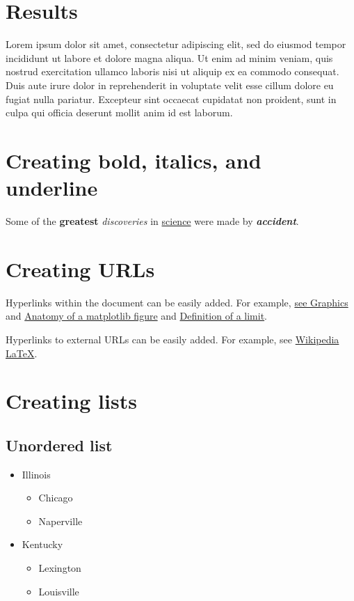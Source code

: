 \documentclass[10pt, letterpaper, twoside]{article}
\begin{document}
\section{Results}\label{sec:results}

Lorem ipsum dolor sit amet, consectetur adipiscing elit, sed do eiusmod tempor incididunt ut labore et dolore magna aliqua. Ut enim ad minim veniam, quis nostrud exercitation ullamco laboris nisi ut aliquip ex ea commodo consequat. Duis aute irure dolor in reprehenderit in voluptate velit esse cillum dolore eu fugiat nulla pariatur. Excepteur sint occaecat cupidatat non proident, sunt in culpa qui officia deserunt mollit anim id est laborum.

\section{Creating bold, italics, and underline}\label{sec:bold_italics_underline}
Some of the \textbf{greatest} \textit{discoveries} in \underline{science} were made by \textbf{\textit{accident}}.

\section{Creating URLs}\label{sec:urls}
Hyperlinks within the document can be easily added. For example, \hyperref[sec:graphics]{see Graphics} and \hyperref[fig:anatomy_of_a_matplotlib_figure]{Anatomy of a matplotlib figure} and \hyperref[def:limit]{Definition of a limit}.

Hyperlinks to external URLs can be easily added. For example, see \href{https://en.wikipedia.org/wiki/Latex}{Wikipedia \LaTeX}.

\newpage
\section{Creating lists}\label{sec:lists}
\subsection{Unordered list}\label{sec:unordered_list}
\begin{itemize}
    \item Illinois
        \begin{itemize} \item Chicago \item Naperville \end{itemize}
    \item Kentucky
        \begin{itemize} \item Lexington \item Louisville \end{itemize}
\end{itemize}
\end{document}
